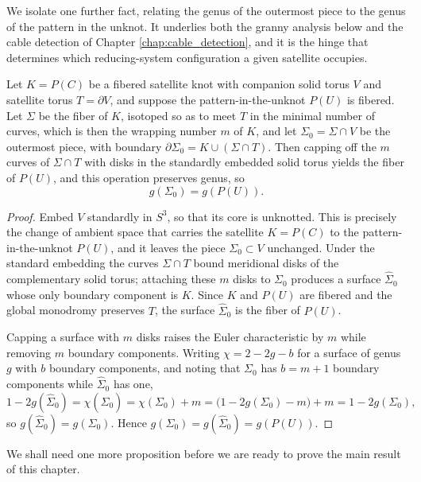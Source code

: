 We isolate one further fact, relating the genus of the outermost piece to the genus of the pattern in the unknot. It underlies both the granny analysis below and the cable detection of Chapter \ref{chap:cable_detection}, and it is the hinge that determines which reducing-system configuration a given satellite occupies.

\begin{lemma}\label{lem:outer_genus_equals_pattern_genus}
Let $K = P(C)$ be a fibered satellite knot with companion solid torus $V$ and satellite torus $T = \partial V$, and suppose the pattern-in-the-unknot $P(U)$ is fibered. Let $\Sigma$ be the fiber of $K$, isotoped so as to meet $T$ in the minimal number of curves, which is then the wrapping number $m$ of $K$, and let $\Sigma_0 = \Sigma \cap V$ be the outermost piece, with boundary $\partial \Sigma_0 = K \cup (\Sigma \cap T)$. Then capping off the $m$ curves of $\Sigma \cap T$ with disks in the standardly embedded solid torus yields the fiber of $P(U)$, and this operation preserves genus, so
\[
g(\Sigma_0) = g(P(U)).
\]
\end{lemma}

\begin{proof}
Embed $V$ standardly in $S^3$, so that its core is unknotted. This is precisely the change of ambient space that carries the satellite $K = P(C)$ to the pattern-in-the-unknot $P(U)$, and it leaves the piece $\Sigma_0 \subset V$ unchanged. Under the standard embedding the curves $\Sigma \cap T$ bound meridional disks of the complementary solid torus; attaching these $m$ disks to $\Sigma_0$ produces a surface $\widehat{\Sigma}_0$ whose only boundary component is $K$. Since $K$ and $P(U)$ are fibered and the global monodromy preserves $T$, the surface $\widehat{\Sigma}_0$ is the fiber of $P(U)$.

Capping a surface with $m$ disks raises the Euler characteristic by $m$ while removing $m$ boundary components. Writing $\chi = 2 - 2g - b$ for a surface of genus $g$ with $b$ boundary components, and noting that $\Sigma_0$ has $b = m+1$ boundary components while $\widehat{\Sigma}_0$ has one,
\[
1 - 2g(\widehat{\Sigma}_0) = \chi(\widehat{\Sigma}_0) = \chi(\Sigma_0) + m = \bigl(1 - 2g(\Sigma_0) - m\bigr) + m = 1 - 2g(\Sigma_0),
\]
so $g(\widehat{\Sigma}_0) = g(\Sigma_0)$. Hence $g(\Sigma_0) = g(\widehat{\Sigma}_0) = g(P(U))$.
\end{proof}

We shall need one more proposition before we are ready to prove the main result of this chapter.

